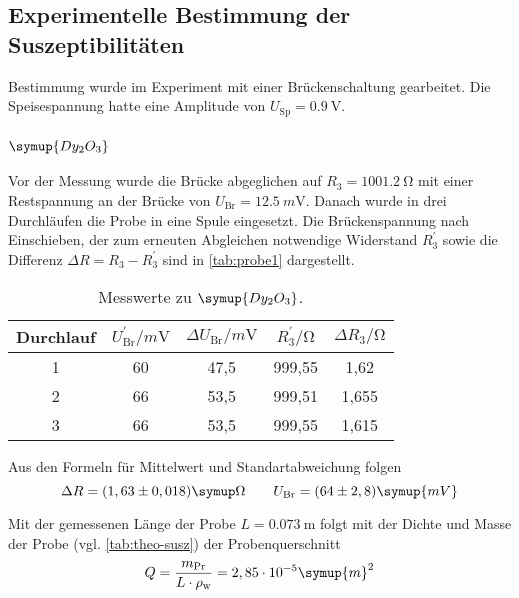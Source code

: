\subsection{Experimentelle Bestimmung der Suszeptibilitäten}
\label{sec:Experimentelle Bestimmung der Suszeptibilitäten}

Bestimmung wurde im Experiment mit einer Brückenschaltung gearbeitet. Die Speisespannung
hatte eine Amplitude von $U_\text{Sp} = \SI{0.9}{\volt}$.

\subsubsection{$\symup{Dy_2O_3}$}
\label{sec:ausw-Dy2O3}

Vor der Messung wurde die Brücke abgeglichen auf $R_3 = \SI{1001.2}{\ohm}$ mit einer
Restspannung an der Brücke von $U_\text{Br} = \SI{12.5}{m\volt}$. Danach wurde in drei
Durchläufen die Probe in eine Spule eingesetzt. Die Brückenspannung nach Einschieben, der
zum erneuten Abgleichen notwendige Widerstand $R_3^\prime$ sowie die Differenz 
$\Delta R = R_3 - R_3^\prime$ sind in \autoref{tab:probe1} dargestellt.

\begin{table}
  \centering
  \caption{Messwerte zu $\symup{Dy_2O_3}$.}
  \label{tab:probe1}
  \begin{tabular}{c c c c c}
  \toprule
  Durchlauf &
  $U_\text{Br}^\prime / \si{m\volt}$ &
  $\Delta U_\text{Br} / \si{m\volt}$ &
  $R_3^\prime / \si{\ohm} $ &
  $\Delta R_3 / \si{\ohm} $ \\
  \midrule
  1 & 60 & 47,5 & 999,55 & 1,62 \\
  2 & 66 & 53,5 & 999,51 & 1,655 \\
  3 & 66 & 53,5 & 999,55 & 1,615 \\
  \bottomrule
  \end{tabular}
\end{table}

Aus den Formeln für Mittelwert und Standartabweichung folgen
\begin{equation}
	\Delta R = (1,63 \pm 0,018) \symup\Omega
	\qquad
	U_\text{Br} = (64 \pm 2,8) \symup{mV}
\end{equation}

Mit der gemessenen Länge der Probe
$L = \SI{0.073}{\meter}$ folgt mit der Dichte und Masse der Probe 
(vgl. \autoref{tab:theo-susz}) der Probenquerschnitt 
\[
	Q =  \frac{m_\text{Pr}}{L \cdot \rho_\text{w}}
	= 2,85 \cdot 10^{-5} \symup{m}^2
\]

